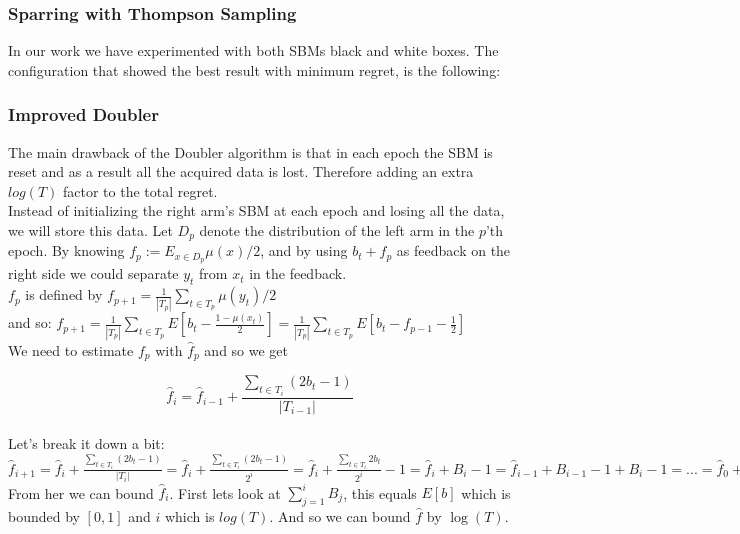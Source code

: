 \documentclass{llncs}
\begin{document}
	\subsubsection{Sparring with Thompson Sampling}
		In our work  we have experimented with both SBMs black and white boxes. The configuration that showed the best result with minimum regret, is the following: 
		
		
		
	\subsubsection{Improved Doubler}
	The main drawback of the Doubler algorithm is that in each epoch the SBM is reset and as a result all the acquired data is lost. Therefore adding an extra $log(T)$ factor to the total regret.\\
	Instead of initializing the right arm’s SBM at each epoch and losing all the data, we will store this data.
Let $D_p$ denote the distribution of the left arm in the $p$’th epoch. 
By knowing $f_p := E_{x\in D_p} \mu(x)/2$, and by using $b_t + f_p$ as feedback on the right side we could separate $y_t$ from $x_t$ in the feedback.
\\
		
		
		$f_p$ is defined by $f_{p+1} = 
		\frac{1}{|T_p|}\sum\limits_{t\in T_p} \mu(y_t)/2$\\
		and so: $f_{p+1} = 
		\frac{1}{|T_p|}\sum\limits_{t\in T_p} E[b_t - \frac{1-\mu(x_t)}{2}] = \frac{1}{|T_p|}\sum\limits_{t\in T_p} E[b_t - f_{p-1}-\frac{1}{2}]$ \\
		We need to estimate $f_p$ with $\hat{f}_p$ and so we get

        $$\hat{f}_i=\hat{f}_{i-1} + \frac{\sum\limits_{t\in T_i} (2b_t -1)}{|T_{i-1}|}$$
		\\		
		Let's break it down a bit:\\
		$\hat{f}_{i+1}=\hat{f}_{i} + 
		\frac{\sum\limits_{t\in T_i} (2b_t -1)}{|T_{i}|} = 
		\hat{f}_{i} + 
		\frac{\sum\limits_{t\in T_i} (2b_t -1)}{2^{i}} = 
		\hat{f}_{i} + 
		\frac{\sum\limits_{t\in T_i} 2b_t}{2^{i}}-1 = 
		\hat{f}_{i} + B_i -1 =  
		\hat{f}_{i-1} +B_{i-1} -1+ B_i -1 = ... =  
		\hat{f}_{0} + \sum\limits_{j=1}^i B_{j}+i$
		\\
		From her we can bound $\hat{f}_{i}$.
		First lets look at $\sum\limits_{j=1}^i B_{j}$, this equals $E[b]$ which is bounded by $[0,1]$ and $i$ which is $log(T)$. And so we can bound $\hat{f}$ by $\log(T)$.
\end{document}
